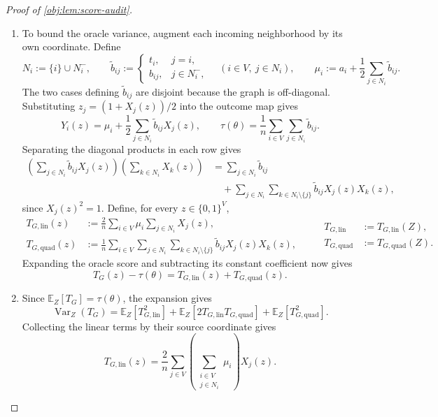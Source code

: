 \documentclass[11pt]{article}
\begin{document}
\begin{proof}[Proof of \cref{obj:lem:score-audit}]
\begin{enumerate}
\item To bound the oracle variance, augment each incoming neighborhood by its own coordinate. Define
\[
N_i:=\{i\}\cup N_i^-,
\qquad
\widetilde b_{ij}:=
\begin{cases}
t_i,&j=i,\\
b_{ij},&j\in N_i^-,
\end{cases}
\quad(i\in V,\ j\in N_i),
\qquad
\mu_i:=a_i+\frac12\sum_{j\in N_i}\widetilde b_{ij}.
\]
The two cases defining \(\widetilde b_{ij}\) are disjoint because the graph is off-diagonal. Substituting \(z_j=(1+X_j(z))/2\) into the outcome map gives
\[
Y_i(z)=\mu_i+\frac12\sum_{j\in N_i}\widetilde b_{ij}X_j(z),
\qquad
\tau(\theta)=\frac1n\sum_{i\in V}\sum_{j\in N_i}\widetilde b_{ij}.
\]
Separating the diagonal products in each row gives
\[
\begin{aligned}
\left(\sum_{j\in N_i}\widetilde b_{ij}X_j(z)\right)
\left(\sum_{k\in N_i}X_k(z)\right)
&=\sum_{j\in N_i}\widetilde b_{ij}\\
&\quad+\sum_{j\in N_i}\sum_{k\in N_i\setminus\{j\}}
\widetilde b_{ij}X_j(z)X_k(z),
\end{aligned}
\]
since \(X_j(z)^2=1\). Define, for every \(z\in\{0,1\}^{V}\),
\[
\begin{aligned}
T_{G,\mathrm{lin}}(z)
&:=\frac2n\sum_{i\in V}\mu_i\sum_{j\in N_i}X_j(z),\\
T_{G,\mathrm{quad}}(z)
&:=\frac1n\sum_{i\in V}\sum_{j\in N_i}
 \sum_{k\in N_i\setminus\{j\}}\widetilde b_{ij}X_j(z)X_k(z),
\end{aligned}
\qquad
\begin{aligned}
T_{G,\mathrm{lin}}&:=T_{G,\mathrm{lin}}(Z),\\
T_{G,\mathrm{quad}}&:=T_{G,\mathrm{quad}}(Z).
\end{aligned}
\]
Expanding the oracle score and subtracting its constant coefficient now gives
\[
T_G(z)-\tau(\theta)
=T_{G,\mathrm{lin}}(z)+T_{G,\mathrm{quad}}(z).
\]

\item Since \(\mathbb E_Z[T_G]=\tau(\theta)\), the expansion gives
\[
\operatorname{Var}_Z(T_G)
=
\mathbb E_Z[T_{G,\mathrm{lin}}^2]
+\mathbb E_Z[2T_{G,\mathrm{lin}}T_{G,\mathrm{quad}}]
+\mathbb E_Z[T_{G,\mathrm{quad}}^2].
\]
Collecting the linear terms by their source coordinate gives
\[
T_{G,\mathrm{lin}}(z)
=
\frac2n\sum_{j\in V}
\left(\sum_{\substack{i\in V\\j\in N_i}}\mu_i\right)X_j(z).
\]


\end{enumerate}
\end{proof}
\end{document}

